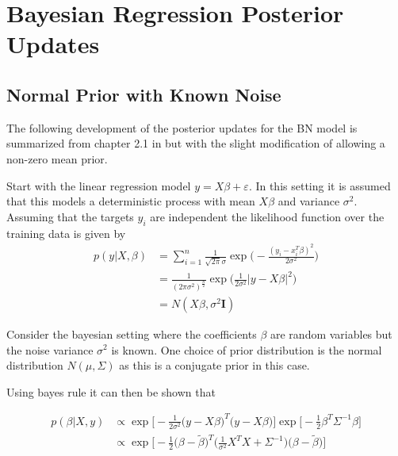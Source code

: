 \appendix

\chapter{Bayesian Regression Posterior Updates}

\section{Normal Prior with Known Noise}{\label{a:bn}

The following development of the posterior updates for the BN model is summarized from chapter 2.1 in \cite{rasmussen_2006} but with the slight modification of allowing a non-zero mean prior. 

Start with the linear regression model $y=X\beta + \varepsilon$. In this setting it is assumed that this models a deterministic process with mean $X\beta$ and variance $\sigma^2$. Assuming that the targets $y_i$ are independent the likelihood function over the training data is given by
\begin{equation}
    \begin{split}
        p(y|X,\beta) &= \sum^n_{i=1} \frac{1}{\sqrt{2\pi}\sigma}\exp\Bigg(-\frac{(y_i - x_i^T\beta)^2}{2\sigma^2}\Bigg)\\
        &=\frac{1}{(2\pi\sigma^2)^\frac{n}{2}}\exp\bigg(\frac{1}{2\sigma^2}|y - X\beta|^2\bigg)\\
        &= N(X\beta, \sigma^2\bm{I})
    \end{split}
\end{equation}

Consider the bayesian setting where the coefficients $\beta$ are random variables but the noise variance $\sigma^2$ is known. One choice of prior distribution is the normal distribution $N(\mu, \Sigma)$ as this is a conjugate prior in this case.

Using bayes rule it can then be shown that

\begin{equation}
    \label{eq:post_proof_bn}
    \begin{split}
        p(\beta|X,y) &\propto \exp\bigg[-\frac{1}{2\sigma^2}\big(y-X\beta\big)^T\big(y-X\beta\big)\bigg]\exp\bigg[-\frac{1}{2}\beta^T\Sigma^{-1}\beta\bigg] \\
        &\propto \exp\bigg[-\frac{1}{2}\Big(\beta-\tilde{\beta}\Big)^T\Big(\frac{1}{\sigma^2}X^TX + \Sigma^{-1}\Big)\Big(\beta - \tilde{\beta}\Big)\bigg]
    \end{split}
\end{equation}

}
